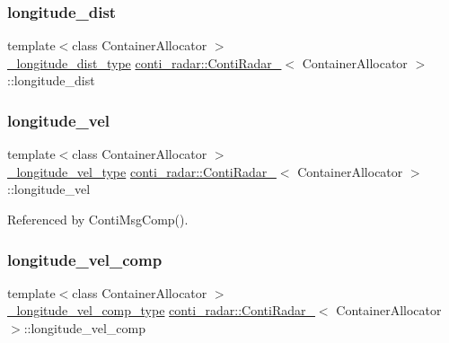 \subsubsection{\texorpdfstring{longitude\+\_\+dist}{longitude\_dist}}
{\footnotesize\ttfamily template$<$class Container\+Allocator $>$ \\
\hyperlink{structconti__radar_1_1ContiRadar___a165d35c3e291b895e03290883feaf8a9}{\+\_\+longitude\+\_\+dist\+\_\+type} \hyperlink{structconti__radar_1_1ContiRadar__}{conti\+\_\+radar\+::\+Conti\+Radar\+\_\+}$<$ Container\+Allocator $>$\+::longitude\+\_\+dist}

\mbox{\label{structconti__radar_1_1ContiRadar___aae3f89b4d43e205ec1f19af76a4d9554}} 
\subsubsection{\texorpdfstring{longitude\+\_\+vel}{longitude\_vel}}
{\footnotesize\ttfamily template$<$class Container\+Allocator $>$ \\
\hyperlink{structconti__radar_1_1ContiRadar___af042240d6e52b741e4a641e13e8c0b09}{\+\_\+longitude\+\_\+vel\+\_\+type} \hyperlink{structconti__radar_1_1ContiRadar__}{conti\+\_\+radar\+::\+Conti\+Radar\+\_\+}$<$ Container\+Allocator $>$\+::longitude\+\_\+vel}



Referenced by Conti\+Msg\+Comp().

\mbox{\label{structconti__radar_1_1ContiRadar___a5f56de1387fecff209fc81f5097703b9}} 
\subsubsection{\texorpdfstring{longitude\+\_\+vel\+\_\+comp}{longitude\_vel\_comp}}
{\footnotesize\ttfamily template$<$class Container\+Allocator $>$ \\
\hyperlink{structconti__radar_1_1ContiRadar___a3f85fb9d65be899731b3261b3e788197}{\+\_\+longitude\+\_\+vel\+\_\+comp\+\_\+type} \hyperlink{structconti__radar_1_1ContiRadar__}{conti\+\_\+radar\+::\+Conti\+Radar\+\_\+}$<$ Container\+Allocator $>$\+::longitude\+\_\+vel\+\_\+comp}

